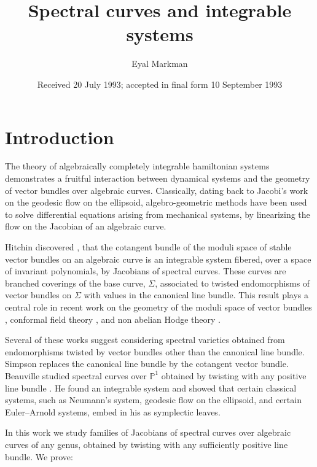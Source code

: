 \documentclass[12pt,a4paper,oneside,english]{smfart}
\title{Spectral curves and integrable systems}
\author{Eyal Markman}
\date{Received 20 July 1993; accepted in final form 10 September 1993}
\theoremstyle{definition}
\theoremstyle{remark}
\begin{document}
\maketitle
\thispagestyle{plain}

\section{Introduction}\label{sec:1}

The theory of algebraically completely integrable hamiltonian systems demonstrates a fruitful interaction between dynamical systems and the geometry of vector bundles over algebraic curves. Classically, dating back to Jacobi's work on the geodesic flow on the ellipsoid, algebro-geometric methods have been used to solve differential equations arising from mechanical systems, by linearizing the flow on the Jacobian of an algebraic curve.

Hitchin discovered \cite{H1}, that the cotangent bundle of the moduli space of stable vector bundles on an algebraic curve is an integrable system fibered, over a space of invariant polynomials, by Jacobians of spectral curves. These curves are branched coverings of the base curve, $\Sigma$, associated to twisted endomorphisms of vector bundles on $\Sigma$ with values in the canonical line bundle. This result plays a central role in recent work on the geometry of the moduli space of vector bundles \cite{B-N-R}, conformal field theory \cite{H2}, and non abelian Hodge theory \cite{Sim}.

Several of these works suggest considering spectral varieties obtained from endomorphisms twisted by vector bundles other than the canonical line bundle. Simpson replaces the canonical line bundle by the cotangent vector bundle. Beauville studied spectral curves over $\mathbb{P}^1$ obtained by twisting with any positive line bundle \cite{B}. He found an integrable system and showed that certain classical systems, such as Neumann's system, geodesic flow on the ellipsoid, and certain Euler--Arnold systems, embed in his as symplectic leaves.

In this work we study families of Jacobians of spectral curves over algebraic curves of any genus, obtained by twisting with any sufficiently positive line bundle. We prove:
\end{document}
